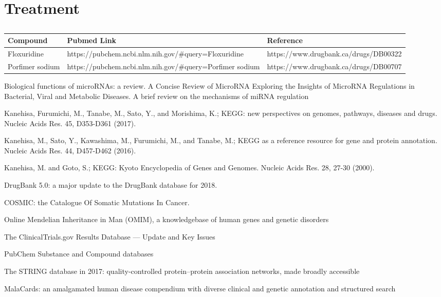 \section{Treatment}

\begin{table}[H]\centering
 \caption {\cite{key470}\cite{key400}}
	\begin{tabular}{p{1cm}p{4cm}p{3cm}}
	Compound & Pubmed Link & Reference\\
		\hline
	Floxuridine & https://pubchem.ncbi.nlm.nih.gov/#query=Floxuridine & https://www.drugbank.ca/drugs/DB00322 \\
	Porfimer sodium & https://pubchem.ncbi.nlm.nih.gov/#query=Porfimer sodium & https://www.drugbank.ca/drugs/DB00707 \\
	\hline
	\end{tabular}
\end{table}



 Biological functions of microRNAs: a review.
 A Concise Review of MicroRNA Exploring the Insights of MicroRNA Regulations in Bacterial, Viral and Metabolic Diseases.
 A brief review on the mechanisms of miRNA regulation



 Kanehisa, Furumichi, M., Tanabe, M., Sato, Y., and Morishima, K.; 
\newblock KEGG: new perspectives on genomes, pathways, diseases and drugs. 
\newblock Nucleic Acids Res. 45, D353-D361 (2017).

 Kanehisa, M., Sato, Y., Kawashima, M., Furumichi, M., and Tanabe, M.; 
\newblock KEGG as a reference resource for gene and protein annotation. 
\newblock Nucleic Acids Res. 44, D457-D462 (2016).

 Kanehisa, M. and Goto, S.; 
\newblock KEGG: Kyoto Encyclopedia of Genes and Genomes. 
\newblock Nucleic Acids Res. 28, 27-30 (2000). 

 DrugBank 5.0: a major update to the DrugBank database for 2018.

 COSMIC: the Catalogue Of Somatic Mutations In Cancer.

 Online Mendelian Inheritance in Man (OMIM), a knowledgebase of human genes and genetic disorders

 The ClinicalTrials.gov Results Database — Update and Key Issues

 PubChem Substance and Compound databases

 The STRING database in 2017: quality-controlled protein–protein association networks, made broadly accessible

 MalaCards: an amalgamated human disease compendium with diverse clinical and genetic annotation and structured search


